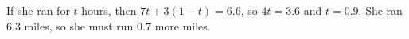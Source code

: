 If she ran for $t$ hours, then $7t+3(1-t)=6.6$, so $4t=3.6$ and $t=0.9$. She ran $6.3$ miles, so she must run $\boxed{0.7}$ more miles.
